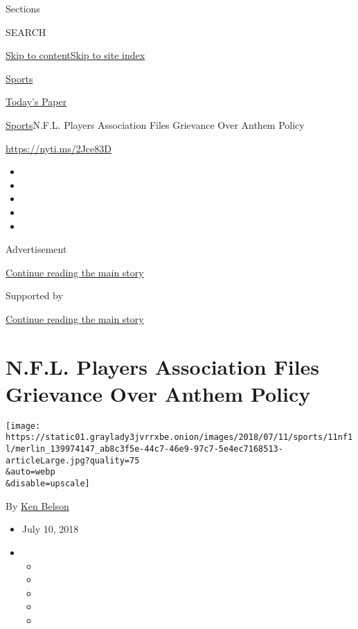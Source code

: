 Sections

SEARCH

\protect\hyperlink{site-content}{Skip to
content}\protect\hyperlink{site-index}{Skip to site index}

\href{https://www.nytimes3xbfgragh.onion/section/sports}{Sports}

\href{https://myaccount.nytimes3xbfgragh.onion/auth/login?response_type=cookie\&client_id=vi}{}

\href{https://www.nytimes3xbfgragh.onion/section/todayspaper}{Today's
Paper}

\href{/section/sports}{Sports}\textbar{}N.F.L. Players Association Files
Grievance Over Anthem Policy

\url{https://nyti.ms/2Jce83D}

\begin{itemize}
\item
\item
\item
\item
\item
\end{itemize}

Advertisement

\protect\hyperlink{after-top}{Continue reading the main story}

Supported by

\protect\hyperlink{after-sponsor}{Continue reading the main story}

\hypertarget{nfl-players-association-files-grievance-over-anthem-policy}{%
\section{N.F.L. Players Association Files Grievance Over Anthem
Policy}\label{nfl-players-association-files-grievance-over-anthem-policy}}

\texttt{[image: https://static01.graylady3jvrrxbe.onion/images/2018/07/11/sports/11nf1l/merlin\_139974147\_ab8c3f5e-44c7-46e9-97c7-5e4ec7168513-articleLarge.jpg?quality=75\\\&auto=webp\\\&disable=upscale]}

By \href{http://www.nytimes3xbfgragh.onion/by/ken-belson}{Ken Belson}

\begin{itemize}
\item
  July 10, 2018
\item
  \begin{itemize}
  \item
  \item
  \item
  \item
  \item
  \end{itemize}
\end{itemize}

